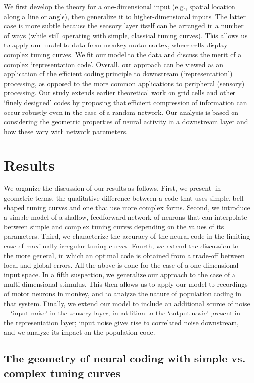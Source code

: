\documentclass[a4paper]{article}%
\begin{document}
We first develop the theory for a one-dimensional input (e.g., spatial
location along a line or angle), then generalize it to higher-dimensional
inputs. The latter case is more subtle because the sensory layer itself can be
arranged in a number of ways (while still operating with simple, classical
tuning curves). This allows us to apply our model to data from monkey motor
cortex, where cells display complex tuning curves. We fit our model to the
data and discuss the merit of a complex `representation code'. Overall, our
approach can be viewed as an application of the efficient coding principle to
downstream (`representation') processing, as opposed to the more common
applications to peripheral (sensory) processing. Our study extends earlier
theoretical work on grid cells and other `finely designed' codes by proposing
that efficient compression of information can occur robustly even in the case
of a random network. Our analysis is based on considering the geometric
properties of neural activity in a downstream layer and how these vary with
network parameters.

\section{Results}
We organize the discussion of our results as follows. First, we present, in geometric terms, the qualitative
difference between a code that uses simple, bell-shaped tuning curves and one
that use more complex forms. Second, we introduce a simple model of a
shallow, feedforward network of neurons that can interpolate between simple and
complex tuning curves depending on the values of its parameters. Third, we
characterize the accuracy of the neural code in the limiting case of maximally
irregular tuning curves. Fourth, we extend the discussion to the more general,
in which an optimal code is obtained from a trade-off between local and global
errors. All the above is done for the case of a one-dimensional input space.
In a fifth suspection, we generalize our approach to the case of a
multi-dimensional stimulus. This then allows us to apply our model to
recordings of motor neurons in monkey, and to analyze the nature of population
coding in that system. Finally, we extend our model to include an additional
source of noise---`input noise' in the sensory layer, in addition to the
`output nosie' present in the representation layer; input noise gives rise to
correlated noise downstream, and we analyze its impact on the population code.

\subsection{The geometry of neural coding with simple vs. complex tuning
curves}
\end{document}
